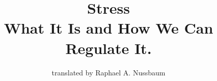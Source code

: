 \usepackage{setspace}
\raggedbottom

\newenvironment{fminipage}%
{\begin{Sbox}\begin{minipage}}%
{\end{minipage}\end{Sbox}\fbox{\TheSbox}}

\newcommand{\STAB}[1]{\begin{tabular}{@{}c@{}}#1\end{tabular}}

\graphicspath{{./images/} {./images/Stress/} {./images/Learning/} {./images/Emotions/} {./images/Nutrition/} {./images/Psychology/} {./images/Sexuality/} {./images/Medicine/}}

\usepackage{subfiles} %

\makeindex
\author{translated by Raphael A. Nussbaum}
\title{Stress \\ What It Is and How We Can Regulate It.}

